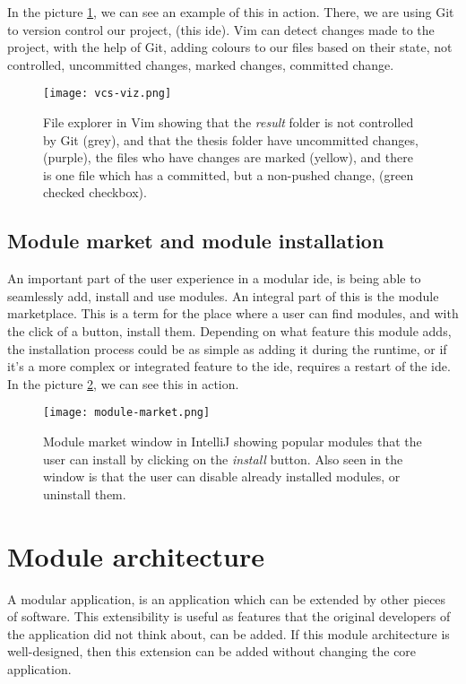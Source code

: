 In the picture \ref{pic:vcsViz}, we can see an example of this in action. There,
we are using Git to version control our project, (this \gls*{ide}). Vim
can detect changes made to the project, with the help of Git, adding colours to
our files based on their state, not controlled, uncommitted changes, marked
changes, committed change.

\begin{figure}
  \centering
  \texttt{[image: vcs-viz.png]}
  \caption{
    File explorer in Vim showing that the \textit{result} folder is not
    controlled by Git (grey), and that the thesis folder have uncommitted
    changes, (purple), the files who have changes are marked (yellow), and there
    is one file which has a committed, but a non-pushed change, (green checked
    checkbox).
  }
  \label{pic:vcsViz}
\end{figure}

\subsection{Module market and module installation}

An important part of the user experience in a modular \gls*{ide}, is being able
to seamlessly add, install and use modules. An integral part of this is the
module marketplace. This is a term for the place where a user can find modules,
and with the click of a button, install them. Depending on what feature this
module adds, the installation process could be as simple as adding it during the
runtime, or if it's a more complex or integrated feature to the \gls*{ide},
requires a restart of the \gls*{ide}. In the picture \ref{pic:market}, we can see
this in action.

\begin{figure}
  \centering
  \texttt{[image: module-market.png]}
  \caption{
    Module market window in IntelliJ showing popular modules that the user can
    install by clicking on the \textit{install} button. Also seen in the window is
    that the user can disable already installed modules, or uninstall them.
  }
  \label{pic:market}
\end{figure}

\section{Module architecture}

A modular application, is an application which can be extended by other pieces
of software. This extensibility is useful as features that the original
developers of the application did not think about, can be added. If this module
architecture is well-designed, then this extension can be added without changing
the core application.


